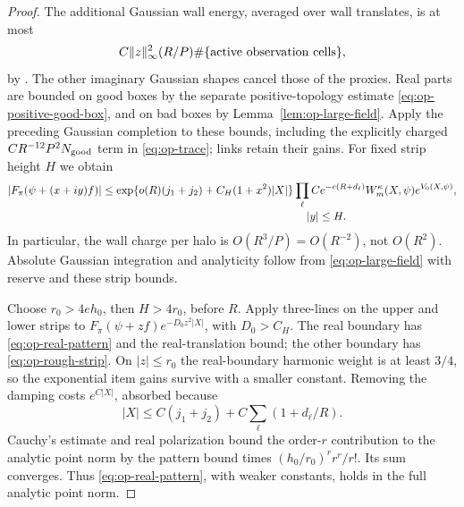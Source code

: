 \begin{proof}
The additional Gaussian wall energy, averaged over wall
translates, is at most
\[
             C\lVert z\rVert_\infty^2(R/P)
                         \#\{\hbox{active observation cells}\},
\]
by .  The other imaginary
Gaussian shapes cancel those of the proxies.  Real
parts are bounded on good boxes by the separate
positive-topology estimate \eqref{eq:op-positive-good-box},
and on bad boxes by Lemma~\ref{lem:op-large-field}.
Apply the preceding Gaussian completion to these bounds,
including the explicitly charged
\(CR^{-12}P^2N_{\rm good}\) term in
\eqref{eq:op-trace}; links retain their gains.
For fixed strip height \(H\) we obtain
\begin{align}\label{eq:op-rough-strip}
 |F_\pi(\psi+(x+iy)f)|
 &\leq
 \exp\{o(R)(j_1+j_2)+C_H(1+x^2)|X|\}
       \prod_\ell Ce^{-c(R+d_\ell)}
       W_m^\kappa(X,\psi)e^{V_0(X,\psi)},\nonumber\\[-2pt]
 &\hspace{65mm}|y|\leq H .
\end{align}
In particular, the wall charge per halo is
\(O(R^3/P)=O(R^{-2})\), not \(O(R^2)\).
Absolute Gaussian integration and analyticity follow
from \eqref{eq:op-large-field} with reserve and these
strip bounds.

Choose \(r_0>4eh_0\), then \(H>4r_0\), before \(R\).
Apply three-lines on the upper and lower strips to
\(F_\pi(\psi+zf)e^{-D_0z^2|X|}\), with \(D_0>C_H\).
The real boundary has \eqref{eq:op-real-pattern} and
the real-translation bound; the other boundary has
\eqref{eq:op-rough-strip}.  On \(|z|\leq r_0\) the
real-boundary harmonic weight is at least \(3/4\), so
the exponential item gains survive with a smaller
constant.  Removing the damping costs
\(e^{C|X|}\), absorbed because
\[
 |X|\leq C(j_1+j_2)+C\sum_\ell(1+d_\ell/R).
\]
Cauchy's estimate and real polarization bound the
order-\(r\) contribution to the analytic point norm
by the pattern bound times
\((h_0/r_0)^r r^r/r!\).  Its sum converges.  Thus
\eqref{eq:op-real-pattern}, with weaker constants,
holds in the full analytic point norm.


\end{proof}
